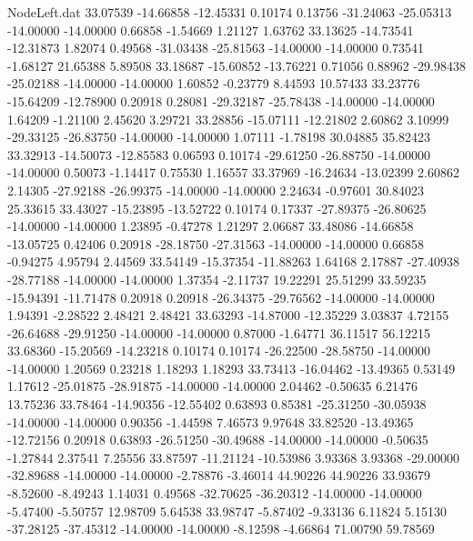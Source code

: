 \begin{filecontents}{NodeLeft.dat}
  33.07539  -14.66858  -12.45331     0.10174    0.13756  -31.24063  -25.05313  -14.00000  -14.00000    0.66858   -1.54669    1.21127    1.63762
  33.13625  -14.73541  -12.31873     1.82074    0.49568  -31.03438  -25.81563  -14.00000  -14.00000    0.73541   -1.68127   21.65388    5.89508
  33.18687  -15.60852  -13.76221     0.71056    0.88962  -29.98438  -25.02188  -14.00000  -14.00000    1.60852   -0.23779    8.44593   10.57433
  33.23776  -15.64209  -12.78900     0.20918    0.28081  -29.32187  -25.78438  -14.00000  -14.00000    1.64209   -1.21100    2.45620    3.29721
  33.28856  -15.07111  -12.21802     2.60862    3.10999  -29.33125  -26.83750  -14.00000  -14.00000    1.07111   -1.78198   30.04885   35.82423
  33.32913  -14.50073  -12.85583     0.06593    0.10174  -29.61250  -26.88750  -14.00000  -14.00000    0.50073   -1.14417    0.75530    1.16557
  33.37969  -16.24634  -13.02399     2.60862    2.14305  -27.92188  -26.99375  -14.00000  -14.00000    2.24634   -0.97601   30.84023   25.33615
  33.43027  -15.23895  -13.52722     0.10174    0.17337  -27.89375  -26.80625  -14.00000  -14.00000    1.23895   -0.47278    1.21297    2.06687
  33.48086  -14.66858  -13.05725     0.42406    0.20918  -28.18750  -27.31563  -14.00000  -14.00000    0.66858   -0.94275    4.95794    2.44569
  33.54149  -15.37354  -11.88263     1.64168    2.17887  -27.40938  -28.77188  -14.00000  -14.00000    1.37354   -2.11737   19.22291   25.51299
  33.59235  -15.94391  -11.71478     0.20918    0.20918  -26.34375  -29.76562  -14.00000  -14.00000    1.94391   -2.28522    2.48421    2.48421
  33.63293  -14.87000  -12.35229     3.03837    4.72155  -26.64688  -29.91250  -14.00000  -14.00000    0.87000   -1.64771   36.11517   56.12215
  33.68360  -15.20569  -14.23218     0.10174    0.10174  -26.22500  -28.58750  -14.00000  -14.00000    1.20569    0.23218    1.18293    1.18293
  33.73413  -16.04462  -13.49365     0.53149    1.17612  -25.01875  -28.91875  -14.00000  -14.00000    2.04462   -0.50635    6.21476   13.75236
  33.78464  -14.90356  -12.55402     0.63893    0.85381  -25.31250  -30.05938  -14.00000  -14.00000    0.90356   -1.44598    7.46573    9.97648
  33.82520  -13.49365  -12.72156     0.20918    0.63893  -26.51250  -30.49688  -14.00000  -14.00000   -0.50635   -1.27844    2.37541    7.25556
  33.87597  -11.21124  -10.53986     3.93368    3.93368  -29.00000  -32.89688  -14.00000  -14.00000   -2.78876   -3.46014   44.90226   44.90226
  33.93679   -8.52600   -8.49243     1.14031    0.49568  -32.70625  -36.20312  -14.00000  -14.00000   -5.47400   -5.50757   12.98709    5.64538
  33.98747   -5.87402   -9.33136     6.11824    5.15130  -37.28125  -37.45312  -14.00000  -14.00000   -8.12598   -4.66864   71.00790   59.78569

\end{filecontents}
